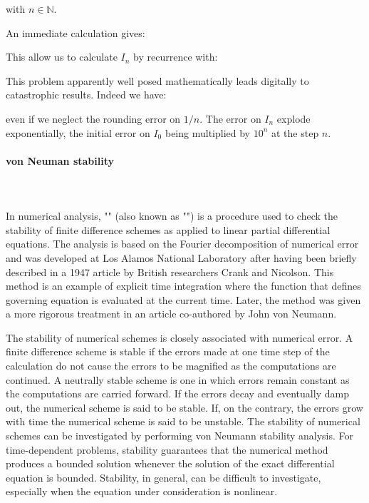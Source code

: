 	with $n\in\mathbb{N}$.
	
	An immediate calculation gives:
	
	This allow us to calculate $I_n$ by recurrence with:
	
	This problem apparently well posed mathematically leads digitally to catastrophic results. Indeed we have:
	
	even if we neglect the rounding error on $1/n$. The error on $I_n$ explode exponentially, the initial error on $I_0$ being multiplied by $10^n$ at the step $n$.
	
	\paragraph{von Neuman stability}\mbox{}\\\\
	In numerical analysis, "" (also known as "") is a procedure used to check the stability of finite difference schemes as applied to linear partial differential equations. The analysis is based on the Fourier decomposition of numerical error and was developed at Los Alamos National Laboratory after having been briefly described in a 1947 article by British researchers Crank and Nicolson. This method is an example of explicit time integration where the function that defines governing equation is evaluated at the current time. Later, the method was given a more rigorous treatment in an article co-authored by John von Neumann.
	
	The stability of numerical schemes is closely associated with numerical error. A finite difference scheme is stable if the errors made at one time step of the calculation do not cause the errors to be magnified as the computations are continued. A neutrally stable scheme is one in which errors remain constant as the computations are carried forward. If the errors decay and eventually damp out, the numerical scheme is said to be stable. If, on the contrary, the errors grow with time the numerical scheme is said to be unstable. The stability of numerical schemes can be investigated by performing von Neumann stability analysis. For time-dependent problems, stability guarantees that the numerical method produces a bounded solution whenever the solution of the exact differential equation is bounded. Stability, in general, can be difficult to investigate, especially when the equation under consideration is nonlinear.
	 
